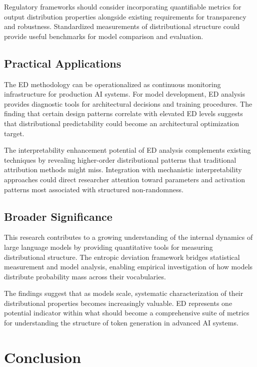 \documentclass[12pt]{article}
\begin{document}
Regulatory frameworks should consider incorporating quantifiable metrics for output distribution properties alongside existing requirements for transparency and robustness. Standardized measurements of distributional structure could provide useful benchmarks for model comparison and evaluation.

\subsection{Practical Applications}

The ED methodology can be operationalized as continuous monitoring infrastructure for production AI systems. For model development, ED analysis provides diagnostic tools for architectural decisions and training procedures. The finding that certain design patterns correlate with elevated ED levels suggests that distributional predictability could become an architectural optimization target.

The interpretability enhancement potential of ED analysis complements existing techniques by revealing higher-order distributional patterns that traditional attribution methods might miss. Integration with mechanistic interpretability approaches could direct researcher attention toward parameters and activation patterns most associated with structured non-randomness.

\subsection{Broader Significance}

This research contributes to a growing understanding of the internal dynamics of large language models by providing quantitative tools for measuring distributional structure. The entropic deviation framework bridges statistical measurement and model analysis, enabling empirical investigation of how models distribute probability mass across their vocabularies.

The findings suggest that as models scale, systematic characterization of their distributional properties becomes increasingly valuable. ED represents one potential indicator within what should become a comprehensive suite of metrics for understanding the structure of token generation in advanced AI systems.

\section{Conclusion}
\end{document}
